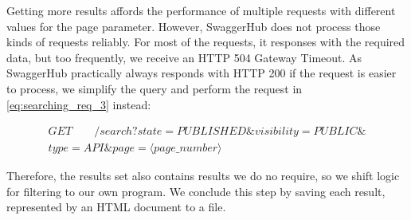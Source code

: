 Getting more results affords the performance of multiple requests with different values for the page parameter.
However, SwaggerHub does not process those kinds of requests reliably. For most of the requests, it responses with the required data, but too frequently, we receive an HTTP 504 Gateway Timeout. 
As SwaggerHub practically always responds with HTTP 200 if the request is easier to process, we simplify the query and perform the request in \ref{eq:searching_req_3} instead:
   
\begin{multline}
\label{eq:searching_req_3}
  GET \qquad /search?state=PUBLISHED\&visibility=PUBLIC\&\\type=API\&page= \langle page \_ number \rangle  
\end{multline}



Therefore, the results set also contains results we do no require, so we shift logic for filtering to our own program. We conclude this step by saving each result, represented by an HTML document to a file.
